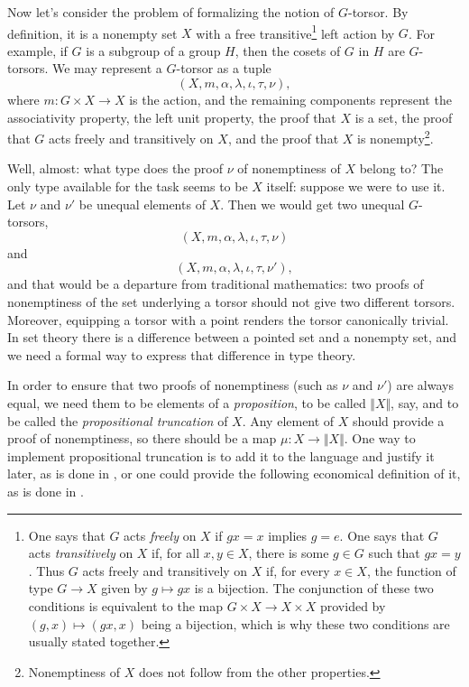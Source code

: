 \documentclass[letter,12pt]{amsart}
\theoremstyle{definition}
\theoremstyle{remark}
\numberwithin{equation}{section}
\newcommand{\nonempty}[1]{{\Vert #1 \Vert}}
\begin{document}
Now let's consider the problem of formalizing the notion of $G$-torsor.  By definition, it is a nonempty set $X$ with a free
transitive\footnote{One says that $G$ acts {\em freely} on $X$ if $gx=x$ implies $g=e$.  One says that $G$ acts {\em transitively} on $X$ if,
  for all $x,y \in X$, there is some $g \in G$ such that $gx=y$.  Thus $G$ acts freely and transitively on $X$ if, for every $x \in X$, the
  function of type $G \to X$ given by $g \mapsto g x$ is a bijection.  The conjunction of these two conditions is equivalent to the map $G
  \times X \to X \times X$ provided by $(g,x) \mapsto (gx,x)$ being a bijection, which is why these two conditions are usually stated together.}
left action by $G$.  For example, if $G$ is a subgroup of a group $H$, then the cosets of $G$ in $H$ are $G$-torsors.  We may represent a
$G$-torsor as a tuple $$(X,m,\alpha,\lambda,\iota,\tau,\nu),$$ where $m : G \times X \to X$ is the action, and the remaining components
represent the associativity property, the left unit property, the proof that $X$ is a set, the proof that $G$ acts freely and transitively on
$X$, and the proof that $X$ is nonempty\footnote{Nonemptiness of $X$ does not follow from the other properties.}.

Well, almost: what type does the proof $\nu$ of nonemptiness of $X$ belong to?  The only type available for the task seems to be $X$ itself:
suppose we were to use it.  Let $\nu$ and $\nu'$ be unequal elements of $X$.  Then we would get two unequal $G$-torsors,
$$(X,m,\alpha,\lambda,\iota,\tau,\nu)$$ and $$(X,m,\alpha,\lambda,\iota,\tau,\nu'),$$ and that would be a departure from traditional
mathematics: two proofs of nonemptiness of the set underlying a torsor should not give two different torsors.  Moreover, equipping a torsor with
a point renders the torsor canonically trivial.  In set theory there is a difference between a pointed set and a nonempty set, and we need a
formal way to express that difference in type theory.

In order to ensure that two proofs of nonemptiness (such as $\nu$ and $\nu'$) are always equal, we need them to be elements of a {\em
  proposition}, to be called $\nonempty{X}$, say, and to be called the {\em propositional truncation} of $X$.  Any element of $X$ should provide
a proof of nonemptiness, so there should be a map $\mu : X \to \nonempty{X}$.  One way to implement propositional truncation is to add it to the
language and justify it later, as is done in \citep{AwodeyBauer_prop_as_types}, or one could provide the following economical definition of
it, as is done in \citep{UniMath}.
\end{document}
